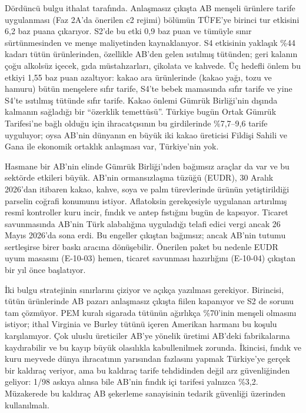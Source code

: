 Dördüncü bulgu ithalat tarafında. Anlaşmasız çıkışta AB menşeli ürünlere tarife uygulanması (Faz 2A'da önerilen c2 rejimi) bölümün TÜFE'ye birinci tur etkisini 6,2 baz puana çıkarıyor. S2'de bu etki 0,9 baz puan ve tümüyle sınır sürtünmesinden ve menşe maliyetinden kaynaklanıyor. S4 etkisinin yaklaşık \%44 kadarı tütün ürünlerinden, özellikle AB'den gelen ısıtılmış tütünden; geri kalanın çoğu alkolsüz içecek, gıda müstahzarları, çikolata ve kahvede. Üç hedefli önlem bu etkiyi 1,55 baz puan azaltıyor: kakao ara ürünlerinde (kakao yağı, tozu ve hamuru) bütün menşelere sıfır tarife, S4'te bebek mamasında sıfır tarife ve yine S4'te ısıtılmış tütünde sıfır tarife. Kakao önlemi Gümrük Birliği'nin dışında kalmanın sağladığı bir ``özerklik temettüsü''. Türkiye bugün Ortak Gümrük Tarifesi'ne bağlı olduğu için ihracatçısının bu girdilerinde \%7,7--9,6 tarife uyguluyor; oysa AB'nin dünyanın en büyük iki kakao üreticisi Fildişi Sahili ve Gana ile ekonomik ortaklık anlaşması var, Türkiye'nin yok.

Hasmane bir AB'nin elinde Gümrük Birliği'nden bağımsız araçlar da var ve bu sektörde etkileri büyük. AB'nin ormansızlaşma tüzüğü (EUDR), 30 Aralık 2026'dan itibaren kakao, kahve, soya ve palm türevlerinde ürünün yetiştirildiği parselin coğrafi konumunu istiyor. Aflatoksin gerekçesiyle uygulanan artırılmış resmî kontroller kuru incir, fındık ve antep fıstığını bugün de kapsıyor. Ticaret savunmasında AB'nin Türk alabalığına uyguladığı telafi edici vergi ancak 26 Mayıs 2026'da sona erdi. Bu engeller çıkıştan bağımsız; ancak AB'nin tutumu sertleşirse birer baskı aracına dönüşebilir. Önerilen paket bu nedenle EUDR uyum masasını (E-10-03) hemen, ticaret savunması hazırlığını (E-10-04) çıkıştan bir yıl önce başlatıyor.

İki bulgu stratejinin sınırlarını çiziyor ve açıkça yazılması gerekiyor. Birincisi, tütün ürünlerinde AB pazarı anlaşmasız çıkışta fiilen kapanıyor ve S2 de sorunu tam çözmüyor. PEM kuralı sigarada tütünün ağırlıkça \%70'inin menşeli olmasını istiyor; ithal Virginia ve Burley tütünü içeren Amerikan harmanı bu koşulu karşılamıyor. Çok uluslu üreticiler AB'ye yönelik üretimi AB'deki fabrikalarına kaydırabilir ve bu kayıp büyük olasılıkla kabullenilmek zorunda. İkincisi, fındık ve kuru meyvede dünya ihracatının yarısından fazlasını yapmak Türkiye'ye gerçek bir kaldıraç veriyor, ama bu kaldıraç tarife tehdidinden değil arz güvenliğinden geliyor: 1/98 askıya alınsa bile AB'nin fındık içi tarifesi yalnızca \%3,2. Müzakerede bu kaldıraç AB şekerleme sanayisinin tedarik güvenliği üzerinden kullanılmalı.

